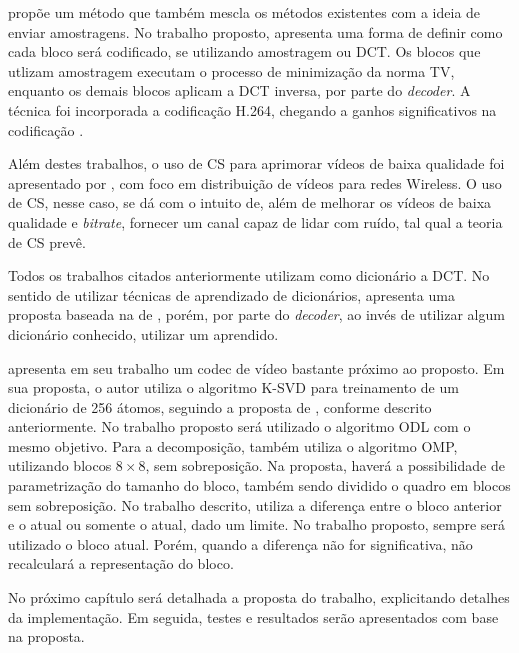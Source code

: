 \documentclass[cic,tc]{iiufrgs}
\begin{document}
\citet{ZhangVideoCS} propõe um método que também mescla os métodos existentes
com a ideia de enviar amostragens. 
No trabalho proposto, apresenta uma forma de definir como cada bloco será codificado,
se utilizando amostragem ou DCT.
Os blocos que utlizam amostragem executam o processo de minimização da norma TV, 
enquanto os demais blocos aplicam a DCT inversa, por parte do \textit{decoder}.
A técnica foi incorporada a codificação H.264, chegando a ganhos significativos na
codificação \cite{ZhangVideoCS}.

Além destes trabalhos, o uso de CS para aprimorar vídeos de baixa qualidade foi 
apresentado por \citet{WirelessXiangCai}, com foco em distribuição de vídeos para
redes Wireless.
O uso de CS, nesse caso, se dá com o intuito de, além de melhorar os vídeos de baixa
qualidade e \textit{bitrate}, fornecer um canal capaz de lidar com ruído, 
tal qual a teoria de CS prevê.

Todos os trabalhos citados anteriormente utilizam como dicionário a DCT.
No sentido de utilizar técnicas de aprendizado de dicionários, 
\citet{chen2010dictionary} apresenta uma proposta baseada na de \citet{ZhangVideoCS},
porém, por parte do \textit{decoder}, ao invés de utilizar algum dicionário conhecido,
utilizar um aprendido.

\citet{lima2012codificaccao2} apresenta em seu trabalho um codec de vídeo bastante 
próximo ao proposto.
Em sua proposta, o autor utiliza o algoritmo K-SVD para treinamento de um dicionário
de 256 átomos, seguindo a proposta de \citeauthor{BRYTFACEKSVD}, conforme descrito
anteriormente.
No trabalho proposto será utilizado o algoritmo ODL com o mesmo objetivo.
Para a decomposição, \citet{lima2012codificaccao2}
também utiliza o algoritmo OMP, utilizando blocos $8\times8$,
sem sobreposição.
Na proposta, haverá a possibilidade de parametrização do tamanho do bloco, 
também sendo dividido o quadro em blocos sem sobreposição.
No trabalho descrito, \citeauthor{lima2012codificaccao2} utiliza a diferença entre o
bloco anterior e o atual ou somente o atual, dado um limite. 
No trabalho proposto, sempre será utilizado o bloco atual.
Porém, quando a diferença não for significativa, não recalculará a representação do bloco.

No próximo capítulo será detalhada a proposta do trabalho, explicitando detalhes
da implementação.
Em seguida, testes e resultados serão apresentados com base na proposta.
\end{document}
